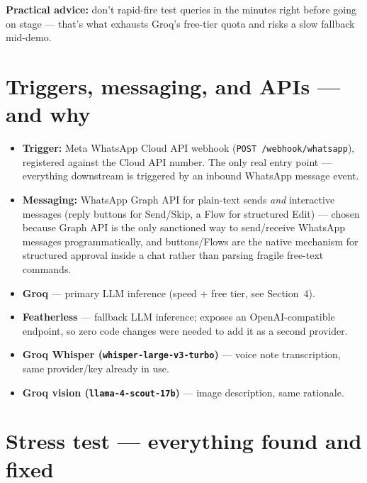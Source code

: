 \documentclass[11pt, a4paper]{article}
\begin{document}
\textbf{Practical advice:} don't rapid-fire test queries in the minutes right before going on stage --- that's what exhausts Groq's free-tier quota and risks a slow fallback mid-demo.

\section{Triggers, messaging, and APIs --- and why}

\begin{itemize}
    \item \textbf{Trigger:} Meta WhatsApp Cloud API webhook (\texttt{POST /webhook/whatsapp}), registered against the Cloud API number. The only real entry point --- everything downstream is triggered by an inbound WhatsApp message event.
    \item \textbf{Messaging:} WhatsApp Graph API for plain-text sends \emph{and} interactive messages (reply buttons for Send/Skip, a Flow for structured Edit) --- chosen because Graph API is the only sanctioned way to send/receive WhatsApp messages programmatically, and buttons/Flows are the native mechanism for structured approval inside a chat rather than parsing fragile free-text commands.
    \item \textbf{Groq} --- primary LLM inference (speed + free tier, see Section~4).
    \item \textbf{Featherless} --- fallback LLM inference; exposes an OpenAI-compatible endpoint, so zero code changes were needed to add it as a second provider.
    \item \textbf{Groq Whisper (\texttt{whisper-large-v3-turbo})} --- voice note transcription, same provider/key already in use.
    \item \textbf{Groq vision (\texttt{llama-4-scout-17b})} --- image description, same rationale.
\end{itemize}

\section{Stress test --- everything found and fixed}
\label{sec:stresstest}
\end{document}

